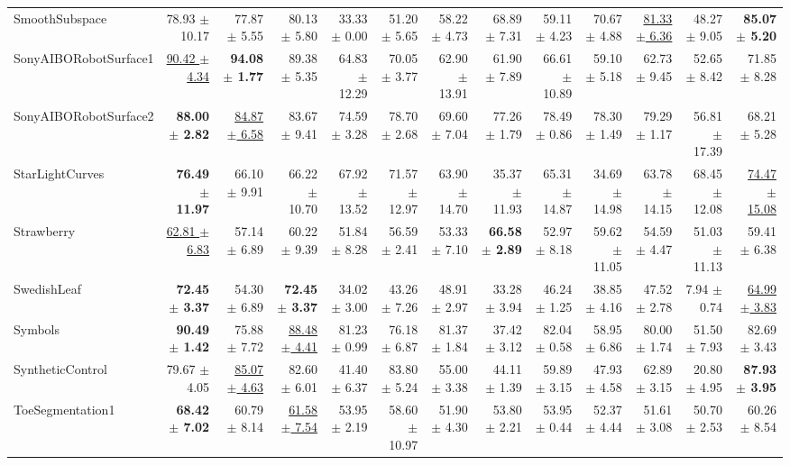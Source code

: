 \begin{landscape}
\begin{longtable}{lrrrrrrrrrrrr}
SmoothSubspace & 78.93 $\pm$ 10.17 & 77.87 $\pm$ 5.55 & 80.13 $\pm$ 5.80 & 33.33 $\pm$ 0.00 & 51.20 $\pm$ 5.65 & 58.22 $\pm$ 4.73 & 68.89 $\pm$ 7.31 & 59.11 $\pm$ 4.23 & 70.67 $\pm$ 4.88 & \underline{81.33 $\pm$ 6.36} & 48.27 $\pm$ 9.05 & \textbf{85.07 $\pm$ 5.20} \\
SonyAIBORobotSurface1 & \underline{90.42 $\pm$ 4.34} & \textbf{94.08 $\pm$ 1.77} & 89.38 $\pm$ 5.35 & 64.83 $\pm$ 12.29 & 70.05 $\pm$ 3.77 & 62.90 $\pm$ 13.91 & 61.90 $\pm$ 7.89 & 66.61 $\pm$ 10.89 & 59.10 $\pm$ 5.18 & 62.73 $\pm$ 9.45 & 52.65 $\pm$ 8.42 & 71.85 $\pm$ 8.28 \\
SonyAIBORobotSurface2 & \textbf{88.00 $\pm$ 2.82} & \underline{84.87 $\pm$ 6.58} & 83.67 $\pm$ 9.41 & 74.59 $\pm$ 3.28 & 78.70 $\pm$ 2.68 & 69.60 $\pm$ 7.04 & 77.26 $\pm$ 1.79 & 78.49 $\pm$ 0.86 & 78.30 $\pm$ 1.49 & 79.29 $\pm$ 1.17 & 56.81 $\pm$ 17.39 & 68.21 $\pm$ 5.28 \\
StarLightCurves & \textbf{76.49 $\pm$ 11.97} & 66.10 $\pm$ 9.91 & 66.22 $\pm$ 10.70 & 67.92 $\pm$ 13.52 & 71.57 $\pm$ 12.97 & 63.90 $\pm$ 14.70 & 35.37 $\pm$ 11.93 & 65.31 $\pm$ 14.87 & 34.69 $\pm$ 14.98 & 63.78 $\pm$ 14.15 & 68.45 $\pm$ 12.08 & \underline{74.47 $\pm$ 15.08} \\
Strawberry & \underline{62.81 $\pm$ 6.83} & 57.14 $\pm$ 6.89 & 60.22 $\pm$ 9.39 & 51.84 $\pm$ 8.28 & 56.59 $\pm$ 2.41 & 53.33 $\pm$ 7.10 & \textbf{66.58 $\pm$ 2.89} & 52.97 $\pm$ 8.18 & 59.62 $\pm$ 11.05 & 54.59 $\pm$ 4.47 & 51.03 $\pm$ 11.13 & 59.41 $\pm$ 6.38 \\
SwedishLeaf & \textbf{72.45 $\pm$ 3.37} & 54.30 $\pm$ 6.89 & \textbf{72.45 $\pm$ 3.37} & 34.02 $\pm$ 3.00 & 43.26 $\pm$ 7.26 & 48.91 $\pm$ 2.97 & 33.28 $\pm$ 3.94 & 46.24 $\pm$ 1.25 & 38.85 $\pm$ 4.16 & 47.52 $\pm$ 2.78 & 7.94 $\pm$ 0.74 & \underline{64.99 $\pm$ 3.83} \\
Symbols & \textbf{90.49 $\pm$ 1.42} & 75.88 $\pm$ 7.72 & \underline{88.48 $\pm$ 4.41} & 81.23 $\pm$ 0.99 & 76.18 $\pm$ 6.87 & 81.37 $\pm$ 1.84 & 37.42 $\pm$ 3.12 & 82.04 $\pm$ 0.58 & 58.95 $\pm$ 6.86 & 80.00 $\pm$ 1.74 & 51.50 $\pm$ 7.93 & 82.69 $\pm$ 3.43 \\
SyntheticControl & 79.67 $\pm$ 4.05 & \underline{85.07 $\pm$ 4.63} & 82.60 $\pm$ 6.01 & 41.40 $\pm$ 6.37 & 83.80 $\pm$ 5.24 & 55.00 $\pm$ 3.38 & 44.11 $\pm$ 1.39 & 59.89 $\pm$ 3.15 & 47.93 $\pm$ 4.58 & 62.89 $\pm$ 3.15 & 20.80 $\pm$ 4.95 & \textbf{87.93 $\pm$ 3.95} \\
ToeSegmentation1 & \textbf{68.42 $\pm$ 7.02} & 60.79 $\pm$ 8.14 & \underline{61.58 $\pm$ 7.54} & 53.95 $\pm$ 2.19 & 58.60 $\pm$ 10.97 & 51.90 $\pm$ 4.30 & 53.80 $\pm$ 2.21 & 53.95 $\pm$ 0.44 & 52.37 $\pm$ 4.44 & 51.61 $\pm$ 3.08 & 50.70 $\pm$ 2.53 & 60.26 $\pm$ 8.54 \\

\end{longtable}
\end{landscape}
